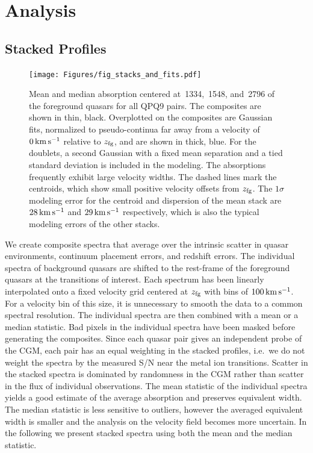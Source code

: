 \documentclass[iop]{emulateapj}
\begin{document}
\section{Analysis}
\label{sec:analysis}

\subsection{Stacked Profiles}
\label{sec:stacks}

\begin{figure}
\texttt{[image: Figures/fig\_stacks\_and\_fits.pdf]}
\caption{Mean and median absorption centered at \,1334, \,1548, and 
\,2796 of the foreground quasars for all QPQ9 pairs. The composites are shown in thin, 
black. Overplotted on the composites are Gaussian fits, normalized to pseudo-continua far away 
from a velocity of $0\,{\rm km\,s^{-1}}$ relative to $z_{\rm fg}$, and are shown in thick, blue. 
For the doublets, a second Gaussian with a fixed mean separation and a tied standard deviation is 
included in the modeling. The absorptions frequently exhibit large velocity widths. The dashed 
lines mark the centroids, which show small positive velocity offsets from $z_{\rm fg}$. The 
$1\sigma$ modeling error for the centroid and dispersion of the  mean stack are 
$28\,{\rm km\,s^{-1}}$ and $29\,{\rm km\,s^{-1}}$ respectively, which is also the typical modeling 
errors of the other stacks.
}
\label{fig:stacks_and_fits}
\end{figure}

We create composite spectra that average over the intrinsic scatter in quasar environments, 
continuum placement errors, and redshift errors. The individual spectra of background quasars are 
shifted to the rest-frame of the foreground quasars at the transitions of interest. Each spectrum 
has been linearly interpolated onto a fixed velocity grid centered at $z_{\rm fg}$ with bins of 
$100\,{\rm km\,s^{-1}}$. For a velocity bin of this size, it is unnecessary to smooth the data to 
a common spectral resolution. The individual spectra are then combined with a mean or a median 
statistic. Bad pixels in the individual spectra have been masked before generating the 
composites. Since each quasar pair gives an independent probe of the CGM, each pair has an equal 
weighting in the stacked profiles, i.e.\ we do not weight the spectra by the measured S/N near the 
metal ion transitions. Scatter in the stacked spectra is dominated by randomness in the CGM rather 
than scatter in the flux of individual observations. The mean statistic of the individual spectra 
yields a good estimate of the average absorption and preserves equivalent width. The median 
statistic is less sensitive to outliers, however the averaged equivalent width is smaller and the 
analysis on the velocity field becomes more uncertain. In the following we present stacked spectra 
using both the mean and the median statistic. 
\end{document}
